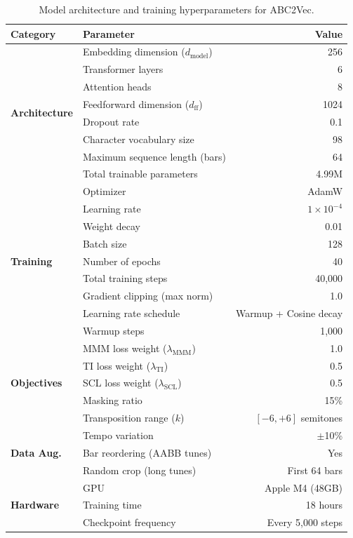 \documentclass[]{interact}
\theoremstyle{plain}
\theoremstyle{definition}
\theoremstyle{remark}
\begin{document}
\begin{table}[!htb]
\centering
\caption{Model architecture and training hyperparameters for ABC2Vec.}
\label{tab:hyperparameters}
\begin{tabular}{@{}llr@{}}
\toprule
\textbf{Category} & \textbf{Parameter} & \textbf{Value} \\
\midrule
\multirow{8}{*}{\textbf{Architecture}}
& Embedding dimension ($d_\text{model}$) & 256 \\
& Transformer layers & 6 \\
& Attention heads & 8 \\
& Feedforward dimension ($d_\text{ff}$) & 1024 \\
& Dropout rate & 0.1 \\
& Character vocabulary size & 98 \\
& Maximum sequence length (bars) & 64 \\
& Total trainable parameters & 4.99M \\
\midrule
\multirow{9}{*}{\textbf{Training}}
& Optimizer & AdamW \\
& Learning rate & $1 \times 10^{-4}$ \\
& Weight decay & 0.01 \\
& Batch size & 128 \\
& Number of epochs & 40 \\
& Total training steps & 40,000 \\
& Gradient clipping (max norm) & 1.0 \\
& Learning rate schedule & Warmup + Cosine decay \\
& Warmup steps & 1,000 \\
\midrule
\multirow{5}{*}{\textbf{Objectives}}
& MMM loss weight ($\lambda_\text{MMM}$) & 1.0 \\
& TI loss weight ($\lambda_\text{TI}$) & 0.5 \\
& SCL loss weight ($\lambda_\text{SCL}$) & 0.5 \\
& Masking ratio & 15\% \\
& Transposition range ($k$) & $[-6, +6]$ semitones \\
\midrule
\multirow{3}{*}{\textbf{Data Aug.}}
& Tempo variation & $\pm$10\% \\
& Bar reordering (AABB tunes) & Yes \\
& Random crop (long tunes) & First 64 bars \\
\midrule
\multirow{3}{*}{\textbf{Hardware}}
& GPU & Apple M4 (48GB) \\
& Training time & 18 hours \\
& Checkpoint frequency & Every 5,000 steps \\
\bottomrule
\end{tabular}
\end{table}
\end{document}
